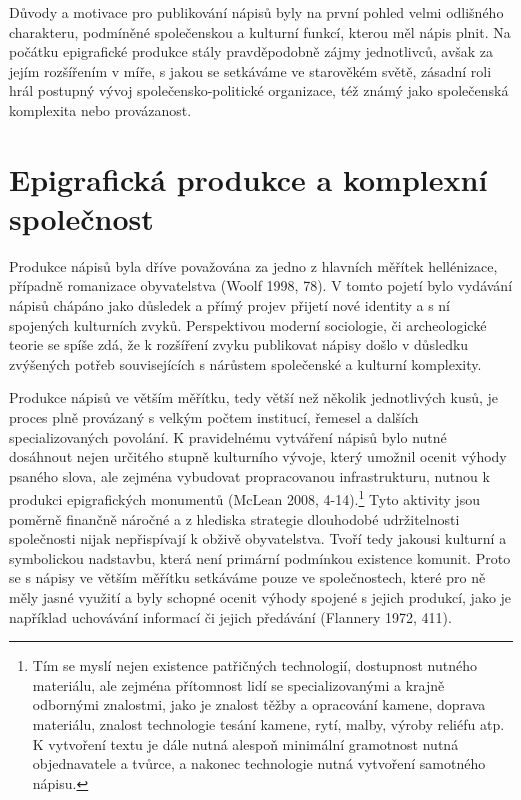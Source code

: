Důvody a motivace pro publikování nápisů byly na první pohled velmi odlišného charakteru, podmíněné společenskou a kulturní funkcí, kterou měl nápis plnit. Na počátku epigrafické produkce stály pravděpodobně zájmy jednotlivců, avšak za jejím rozšířením v míře, s jakou se setkáváme ve starověkém světě, zásadní roli hrál postupný vývoj společensko-politické organizace, též známý jako společenská komplexita nebo provázanost.

\section[epigrafická-produkce-a-komplexní-společnost]{Epigrafická produkce a komplexní společnost}

Produkce nápisů byla dříve považována za jedno z hlavních měřítek hellénizace, případně romanizace obyvatelstva (Woolf 1998, 78). V tomto pojetí bylo vydávání nápisů chápáno jako důsledek a přímý projev přijetí nové identity a s ní spojených kulturních zvyků. Perspektivou moderní sociologie, či archeologické teorie se spíše zdá, že k rozšíření zvyku publikovat nápisy došlo v důsledku zvýšených potřeb souvisejících s nárůstem společenské a kulturní komplexity.

Produkce nápisů ve větším měřítku, tedy větší než několik jednotlivých kusů, je proces plně provázaný s velkým počtem institucí, řemesel a dalších specializovaných povolání. K pravidelnému vytváření nápisů bylo nutné dosáhnout nejen určitého stupně kulturního vývoje, který umožnil ocenit výhody psaného slova, ale zejména vybudovat propracovanou infrastrukturu, nutnou k produkci epigrafických monumentů (McLean 2008, 4-14).\footnote{Tím se myslí nejen existence patřičných technologií, dostupnost nutného materiálu, ale zejména přítomnost lidí se specializovanými a krajně odbornými znalostmi, jako je znalost těžby a opracování kamene, doprava materiálu, znalost technologie tesání kamene, rytí, malby, výroby reliéfu atp. K vytvoření textu je dále nutná alespoň minimální gramotnost nutná objednavatele a tvůrce, a nakonec technologie nutná vytvoření samotného nápisu.} Tyto aktivity jsou poměrně finančně náročné a z hlediska strategie dlouhodobé udržitelnosti společnosti nijak nepřispívají k obživě obyvatelstva. Tvoří tedy jakousi kulturní a symbolickou nadstavbu, která není primární podmínkou existence komunit. Proto se s nápisy ve větším měřítku setkáváme pouze ve společnostech, které pro ně měly jasné využití a byly schopné ocenit výhody spojené s jejich produkcí, jako je například uchovávání informací či jejich předávání (Flannery 1972, 411).

